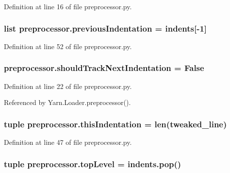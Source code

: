 Definition at line 16 of file preprocessor.\-py.

\hypertarget{a00321_ade44b858578c3eab7b6f90030a0e3ea1}{
\subsubsection[{previous\-Indentation}]{\setlength{\rightskip}{0pt plus 5cm}list preprocessor.\-previous\-Indentation = {\bf indents}\mbox{[}-\/1\mbox{]}}}\label{a00321_ade44b858578c3eab7b6f90030a0e3ea1}


Definition at line 52 of file preprocessor.\-py.

\hypertarget{a00321_afa485f45ab87bc0f06c1dfc46737c057}{
\subsubsection[{should\-Track\-Next\-Indentation}]{\setlength{\rightskip}{0pt plus 5cm}preprocessor.\-should\-Track\-Next\-Indentation = False}}\label{a00321_afa485f45ab87bc0f06c1dfc46737c057}


Definition at line 22 of file preprocessor.\-py.



Referenced by Yarn.\-Loader.\-preprocessor().

\hypertarget{a00321_a0e59365a4aa5811f6495b92a51e23573}{
\subsubsection[{this\-Indentation}]{\setlength{\rightskip}{0pt plus 5cm}tuple preprocessor.\-this\-Indentation = len({\bf tweaked\-\_\-line})}}\label{a00321_a0e59365a4aa5811f6495b92a51e23573}


Definition at line 47 of file preprocessor.\-py.

\hypertarget{a00321_a8b7e5c0b2c6870eaa8f9454b4f33678b}{
\subsubsection[{top\-Level}]{\setlength{\rightskip}{0pt plus 5cm}tuple preprocessor.\-top\-Level = indents.\-pop()}}\label{a00321_a8b7e5c0b2c6870eaa8f9454b4f33678b}


